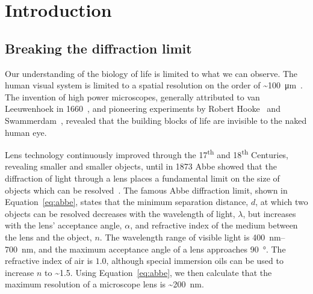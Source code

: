 
\chapter{Introduction}  %

\ifpdf
    \graphicspath{{Chapter1/Figs/Raster/}{Chapter1/Figs/PDF/}{Chapter1/Figs/}}
\else
    \graphicspath{{Chapter1/Figs/Vector/}{Chapter1/Figs/}}
\fi

\section{Breaking the diffraction limit}
Our understanding of the biology of life is limited to what we can observe. 
The human visual system is limited to a spatial resolution on the order of \textasciitilde\SI{100}{\micro\metre}~\cite{devalois1990spatial}.
The invention of high power microscopes, generally attributed to van Leeuwenhoek in 1660~\cite{van1800select}, and pioneering experiments by Robert Hooke~\cite{hooke1667micrographia} and Swammerdam~\cite{swammerdam1758book}, revealed that the building blocks of life are invisible to the naked human eye. 

Lens technology continuously improved through the 17\textsuperscript{th} and 18\textsuperscript{th} Centuries, revealing smaller and smaller objects, until in 1873 Abbe showed that the diffraction of light through a lens places a fundamental limit on the size of objects which can be resolved~\cite{abbe1873beitrage}. The famous Abbe diffraction limit, shown in Equation~\ref{eq:abbe}, states that the minimum separation distance, $d$, at which two objects can be resolved decreases with the wavelength of light, $\lambda$, but increases with the lens' acceptance angle, $\alpha$, and refractive index of the medium between the lens and the object, $n$. The wavelength range of visible light is \SIrange[range-phrase=--]{400}{700}{\nano\metre}, and the maximum acceptance angle of a lens approaches \SI{90}{\degree}. The refractive index of air is $1.0$, although special immersion oils can be used to increase $n$ to \textasciitilde\num{1.5}. Using Equation~\ref{eq:abbe}, we then calculate that the maximum resolution of a microscope lens is \textasciitilde\SI{200}{\nano\metre}. 

